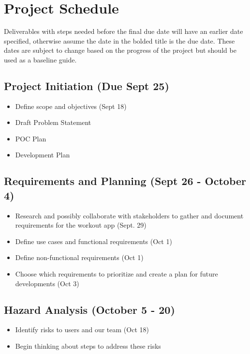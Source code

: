 \documentclass{article}
\begin{document}
	\section{Project Schedule}

	Deliverables with steps needed before the final due date will have an earlier date specified, otherwise assume the date in the bolded title is the due date. These dates are subject to change based on the progress of the project but should be used as a baseline guide.

	\subsection{Project Initiation (Due Sept 25)}
	\begin{itemize}
		\item Define scope and objectives (Sept 18)
		\item Draft Problem Statement
		\item POC Plan
		\item Development Plan
	\end{itemize}

	\subsection{Requirements and Planning (Sept 26 - October 4)}
	\begin{itemize}
		\item Research and possibly collaborate with stakeholders to gather and document requirements for the workout app (Sept. 29)
		\item Define use cases and functional requirements (Oct 1)
		\item Define non-functional requirements (Oct 1)
		\item Choose which requirements to prioritize and create a plan for future developments (Oct 3)
	\end{itemize}

	\subsection{Hazard Analysis (October 5 - 20)}
	\begin{itemize}
		\item Identify risks to users and our team (Oct 18)
		\item Begin thinking about steps to address these risks
	\end{itemize}
\end{document}
